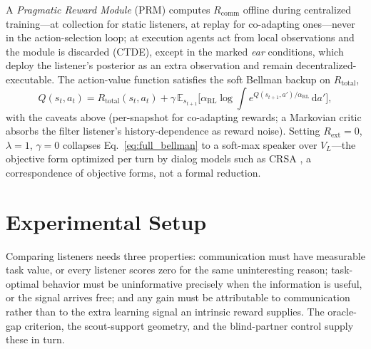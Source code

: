 \documentclass[sigconf,review,anonymous]{acmart}
\newcommand{\Rcomm}{R_{\text{comm}}}
\newcommand{\Rext}{R_{\text{ext}}}
\newcommand{\Rtotal}{R_{\text{total}}}
\newcommand{\VL}{V_L}
\newcommand{\AlphaRL}{\alpha_{\text{RL}}}
\begin{document}
A \emph{Pragmatic Reward Module} (PRM) computes $\Rcomm$ offline during centralized training---at collection for static listeners, at replay for co-adapting ones---never in the action-selection loop; at execution agents act from local observations and the module is discarded (CTDE), except in the marked \emph{ear} conditions, which deploy the listener's posterior as an extra observation and remain decentralized-executable. The action-value function satisfies the soft Bellman backup on $\Rtotal$,
\begin{equation}
\label{eq:full_bellman}
Q(s_t, a_t) = \Rtotal(s_t, a_t) + \gamma\, \mathbb{E}_{s_{t+1}}\Big[\AlphaRL \log \!\int\! e^{Q(s_{t+1}, a')/\AlphaRL}\, \mathrm{d}a'\Big],
\end{equation}
with the caveats above (per-snapshot for co-adapting rewards; a Markovian critic absorbs the filter listener's history-dependence as reward noise). Setting $\Rext=0$, $\lambda=1$, $\gamma=0$ collapses Eq.~\ref{eq:full_bellman} to a soft-max speaker over $\VL$---the objective form optimized per turn by dialog models such as CRSA \cite{estienne2025collaborative}, a correspondence of objective forms, not a formal reduction.

\section{Experimental Setup}
\label{sec:methodology}

Comparing listeners needs three properties: communication must have measurable task value, or every listener scores zero for the same uninteresting reason; task-optimal behavior must be uninformative precisely when the information is useful, or the signal arrives free; and any gain must be attributable to communication rather than to the extra learning signal an intrinsic reward supplies. The oracle-gap criterion, the scout-support geometry, and the blind-partner control supply these in turn.
\end{document}
